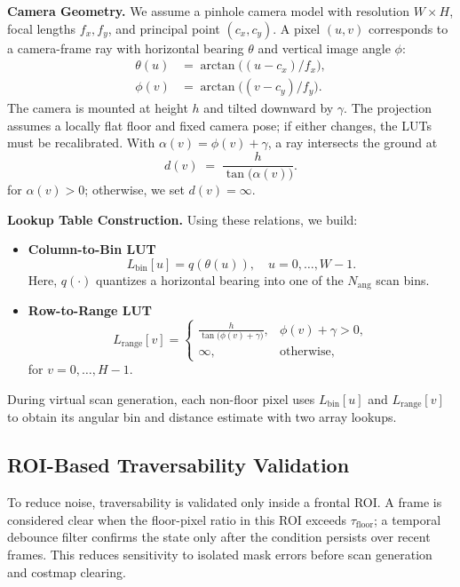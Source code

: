\documentclass{IJCAS}
\begin{document}
\smallskip
\noindent\textbf{Camera Geometry.}
We assume a pinhole camera model with resolution $W\times H$, focal lengths $f_x,f_y$, and principal point $(c_x,c_y)$. A pixel $(u,v)$ corresponds to a camera-frame ray with horizontal bearing $\theta$ and vertical image angle $\phi$:
\begin{align*}
  \theta(u) &= \arctan\!\bigl((u - c_x)/f_x\bigr), \\
  \phi(v)   &= \arctan\!\bigl((v - c_y)/f_y\bigr).
\end{align*}
The camera is mounted at height $h$ and tilted downward by $\gamma$. The projection assumes a locally flat floor and fixed camera pose; if either changes, the LUTs must be recalibrated. With $\alpha(v)=\phi(v)+\gamma$, a ray intersects the ground at
\[
  d(v) \;=\; \frac{h}{\tan\!\bigl(\alpha(v)\bigr)}.
\]
for $\alpha(v)>0$; otherwise, we set $d(v)=\infty$.

\smallskip
\noindent\textbf{Lookup Table Construction.}
Using these relations, we build:
\begin{itemize}
  \item \textbf{Column-to-Bin LUT}
    \[
      L_{\mathrm{bin}}[u]
      = q\!\left(\theta(u)\right),
      \quad u = 0,\dots,W-1.
    \]
    Here, $q(\cdot)$ quantizes a horizontal bearing into one of the $N_{\mathrm{ang}}$ scan bins.
  \item \textbf{Row-to-Range LUT}
    \[
      L_{\mathrm{range}}[v]
      = \begin{cases}
        \displaystyle \frac{h}{\tan\!\bigl(\phi(v)+\gamma\bigr)}, & \phi(v)+\gamma>0,\\
        \infty, & \text{otherwise},
      \end{cases}
    \]
    for $v = 0,\dots,H-1$.
\end{itemize}
During virtual scan generation, each non-floor pixel uses $L_{\mathrm{bin}}[u]$ and $L_{\mathrm{range}}[v]$ to obtain its angular bin and distance estimate with two array lookups.

\subsection{ROI-Based Traversability Validation}\label{sec:roi}

To reduce noise, traversability is validated only inside a frontal ROI. A frame is considered clear when the floor-pixel ratio in this ROI exceeds $\tau_{\mathrm{floor}}$; a temporal debounce filter confirms the state only after the condition persists over recent frames. This reduces sensitivity to isolated mask errors before scan generation and costmap clearing.
\end{document}
